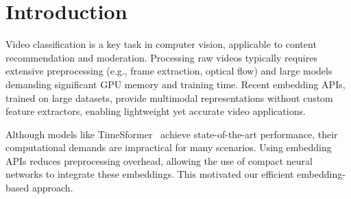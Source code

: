 \section{Introduction}


Video classification is a key task in computer vision, applicable to content recommendation and moderation.
Processing raw videos typically requires extensive preprocessing (e.g., frame extraction, optical flow) and large models demanding significant GPU memory and training time.
Recent embedding APIs, trained on large datasets, provide multimodal representations without custom feature extractors, enabling lightweight yet accurate video applications.


Although models like TimeSformer~\cite{bertasius2021space} achieve state-of-the-art performance, their computational demands are impractical for many scenarios.
Using embedding APIs reduces preprocessing overhead, allowing the use of compact neural networks to integrate these embeddings.
This motivated our efficient embedding-based approach.


